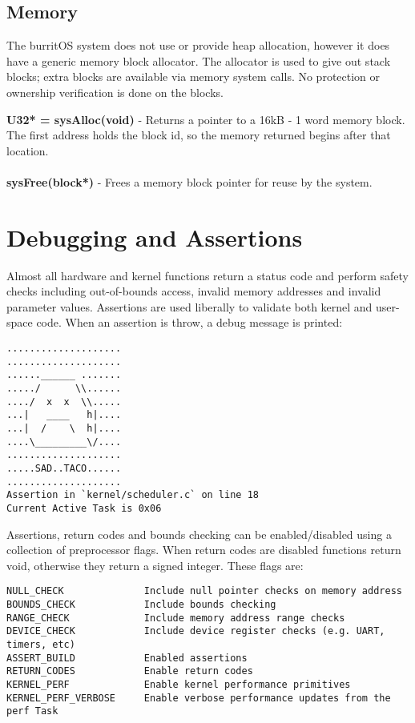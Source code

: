 \documentclass[twoside,a4paper]{refart}
\begin{document}
\subsection{Memory}

The burritOS system does not use or provide heap allocation, however it does have a generic memory block allocator. The allocator is used to give out stack blocks; extra blocks are available via memory system calls. No protection or ownership verification is done on the blocks.

\textbf{U32* = sysAlloc(void)} - Returns a pointer to a 16kB - 1 word memory block. The first address holds the block id, so the memory returned begins after that location.\\\\
\textbf{sysFree(block*)} - Frees a memory block pointer for reuse by the system.

\section{Debugging and Assertions}
 Almost all hardware and kernel functions return a status code and perform safety checks including out-of-bounds access, invalid memory addresses and invalid parameter values. Assertions are used liberally to validate both kernel and user-space code. When an assertion is throw, a debug message is printed:

\begin{verbatim}
....................
....................
......______ .......
...../      \\......
..../  x  x  \\.....
...|   ____   h|....
...|  /    \  h|....
....\_________\/....
....................
.....SAD..TACO......
....................
Assertion in `kernel/scheduler.c` on line 18
Current Active Task is 0x06
\end{verbatim}

Assertions, return codes and bounds checking can be enabled/disabled using a collection of preprocessor flags. When return codes are disabled functions return void, otherwise they return a signed integer. These flags are:\\
\begin{verbatim}
NULL_CHECK              Include null pointer checks on memory address
BOUNDS_CHECK            Include bounds checking
RANGE_CHECK             Include memory address range checks
DEVICE_CHECK            Include device register checks (e.g. UART, timers, etc)
ASSERT_BUILD            Enabled assertions
RETURN_CODES            Enable return codes
KERNEL_PERF             Enable kernel performance primitives
KERNEL_PERF_VERBOSE     Enable verbose performance updates from the perf Task
\end{verbatim}
\end{document}
